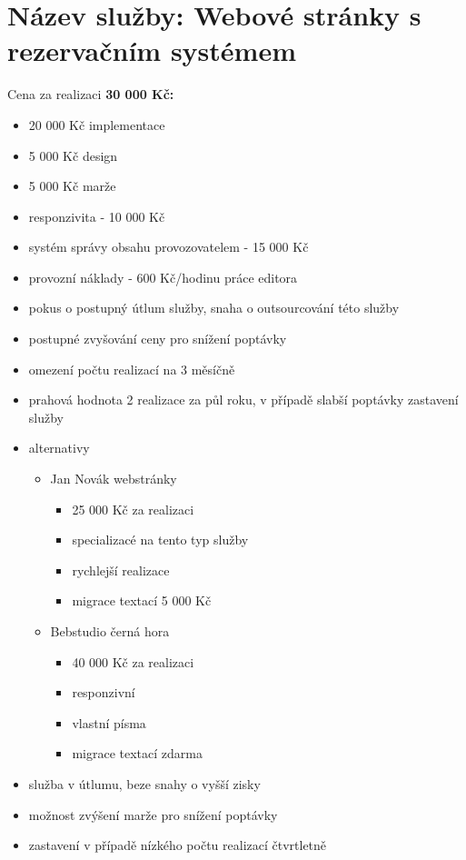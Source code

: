 \documentclass[11pt, a4paper, titlepage]{article}
\begin{document}
	\section*{Název služby: Webové stránky s rezervačním systémem}
		Cena za realizaci \textbf{30 000 Kč:}
		\begin{itemize}
			\item 20 000 Kč implementace
			\item 5 000 Kč design
			\item 5 000 Kč marže
		\end{itemize}
		\begin{itemize}
			\item responzivita - 10 000 Kč
			\item systém správy obsahu provozovatelem - 15 000 Kč
			\item provozní náklady - 600 Kč/hodinu práce editora
		\end{itemize}
		\begin{itemize}
			\item pokus o postupný útlum služby, snaha o outsourcování této služby
			\item postupné zvyšování ceny pro snížení poptávky
			\item omezení počtu realizací na 3 měsíčně
			\item prahová hodnota 2 realizace za půl roku, v případě slabší poptávky zastavení služby
			\item alternativy
			\begin{itemize}
				\item Jan Novák webstránky
				\begin{itemize}
					\item 25 000 Kč za realizaci
					\item specializacé na tento typ služby
					\item rychlejší realizace
					\item migrace textací 5 000 Kč 
				\end{itemize}
				\item Bebstudio černá hora
				\begin{itemize}
					\item 40 000 Kč za realizaci
					\item responzivní
					\item vlastní písma
					\item migrace textací zdarma
				\end{itemize}
			\end{itemize}
			\item služba v útlumu, beze snahy o vyšší zisky
			\item možnost zvýšení marže pro snížení poptávky
			\item zastavení v případě nízkého počtu realizací čtvrtletně
		\end{itemize}
\end{document}
